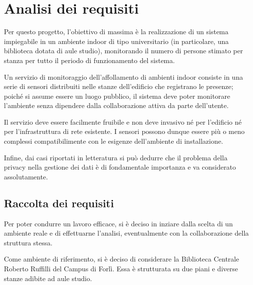 \section{Analisi dei requisiti}



Per questo progetto, l'obiettivo di massima è la realizzazione di un sistema impiegabile in un ambiente indoor di tipo universitario (in particolare, una biblioteca dotata di aule studio),
monitorando il numero di persone stimato per stanza per tutto il periodo di funzionamento del sistema.

Un servizio di monitoraggio dell'affollamento di ambienti indoor consiste in una serie di sensori distribuiti nelle stanze dell'edificio che registrano le presenze;
poiché si assume essere un luogo pubblico, il sistema deve poter monitorare l'ambiente senza dipendere dalla collaborazione attiva da parte dell'utente.

Il servizio deve essere facilmente fruibile e non deve invasivo né per l'edificio né per l'infrastruttura di rete esistente.
I sensori possono dunque essere più o meno complessi compatibilimente con le esigenze dell'ambiente di installazione.

Infine, dai casi riportati in letteratura si può dedurre che il problema della privacy nella gestione dei dati è di fondamentale importanza e va considerato assolutamente.

\subsection{Raccolta dei requisiti}

Per poter condurre un lavoro efficace, si è deciso in inziare dalla scelta di un ambiente reale e di effettuarne l'analisi, eventualmente con la collaborazione della struttura stessa.

Come ambiente di riferimento, si è deciso di considerare la Biblioteca Centrale Roberto Ruffilli del Campus di Forlì.
Essa è strutturata su due piani e diverse stanze adibite ad aule studio. %

